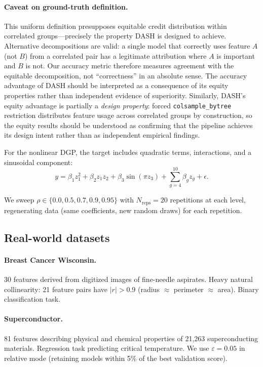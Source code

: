 \documentclass[11pt]{article}
\newcommand{\dash}{\textsc{DASH}}
\newcommand{\rhovar}{\rho}
\begin{document}
\paragraph{Caveat on ground-truth definition.}
This uniform definition presupposes equitable credit distribution
within correlated groups---precisely the property \dash{} is designed
to achieve. Alternative decompositions are valid: a single model that
correctly uses feature $A$ (not $B$) from a correlated pair has a
legitimate attribution where $A$ is important and $B$ is not. Our
accuracy metric therefore measures agreement with the equitable
decomposition, not ``correctness'' in an absolute sense. The accuracy
advantage of \dash{} should be interpreted as a consequence of its
equity properties rather than independent evidence of superiority.
Similarly, \dash{}'s equity advantage is partially a \emph{design
property}: forced \texttt{colsample\_bytree} restriction distributes
feature usage across correlated groups by construction, so the equity
results should be understood as confirming that the pipeline achieves
its design intent rather than as independent empirical findings.

For the nonlinear DGP, the target includes quadratic terms, interactions,
and a sinusoidal component:
\begin{equation}
  y = \beta_1 z_1^2 + \beta_2 z_1 z_2 + \beta_3 \sin(\pi z_3) +
  \sum_{g=4}^{10} \beta_g z_g + \epsilon.
\end{equation}

We sweep $\rhovar \in \{0.0, 0.5, 0.7, 0.9, 0.95\}$ with $N_{\text{reps}}
= 20$ repetitions at each level, regenerating data (same coefficients, new
random draws) for each repetition.

\subsection{Real-world datasets}

\paragraph{Breast Cancer Wisconsin.}
30 features derived from digitized images of fine-needle aspirates. Heavy
natural collinearity: 21 feature pairs have $|r| > 0.9$ (radius $\approx$
perimeter $\approx$ area). Binary classification task.

\paragraph{Superconductor.}
81 features describing physical and chemical properties of 21,263
superconducting materials. Regression task predicting critical temperature.
We use $\varepsilon = 0.05$ in relative mode (retaining models within
5\% of the best validation score).
\end{document}
